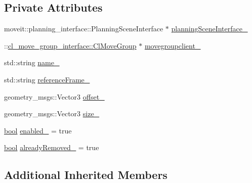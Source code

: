 \subsection*{Private Attributes}
\begin{DoxyCompactItemize}
\item 
moveit\+::planning\+\_\+interface\+::\+Planning\+Scene\+Interface $\ast$ \hyperlink{classsm__fetch__two__table__whiskey__pour_1_1cl__move__group__interface_1_1CpConstraintVirtualSideWall_abc3ab168e5ab2388bf9e0107cc791387}{planning\+Scene\+Interface\+\_\+}
\item 
\+::\hyperlink{classcl__move__group__interface_1_1ClMoveGroup}{cl\+\_\+move\+\_\+group\+\_\+interface\+::\+Cl\+Move\+Group} $\ast$ \hyperlink{classsm__fetch__two__table__whiskey__pour_1_1cl__move__group__interface_1_1CpConstraintVirtualSideWall_a3c89329c38352fd0fa6a75c3c0a69673}{movegroupclient\+\_\+}
\item 
std\+::string \hyperlink{classsm__fetch__two__table__whiskey__pour_1_1cl__move__group__interface_1_1CpConstraintVirtualSideWall_ae90ce7726ac0391281f3f256f855be68}{name\+\_\+}
\item 
std\+::string \hyperlink{classsm__fetch__two__table__whiskey__pour_1_1cl__move__group__interface_1_1CpConstraintVirtualSideWall_a6585ab4c5d9c3dd91be0d2d8b87804bb}{reference\+Frame\+\_\+}
\item 
geometry\+\_\+msgs\+::\+Vector3 \hyperlink{classsm__fetch__two__table__whiskey__pour_1_1cl__move__group__interface_1_1CpConstraintVirtualSideWall_a669238102dc5ac73255f10bc80c1ce69}{offset\+\_\+}
\item 
geometry\+\_\+msgs\+::\+Vector3 \hyperlink{classsm__fetch__two__table__whiskey__pour_1_1cl__move__group__interface_1_1CpConstraintVirtualSideWall_a0e9605699e39ffcda32a22a07fffd544}{size\+\_\+}
\item 
\hyperlink{classbool}{bool} \hyperlink{classsm__fetch__two__table__whiskey__pour_1_1cl__move__group__interface_1_1CpConstraintVirtualSideWall_afdb21410cf37966fbdf12366ebc6dd02}{enabled\+\_\+} = true
\item 
\hyperlink{classbool}{bool} \hyperlink{classsm__fetch__two__table__whiskey__pour_1_1cl__move__group__interface_1_1CpConstraintVirtualSideWall_a9aa0925adf4664e66f5cb5235ca4eeba}{already\+Removed\+\_\+} = true
\end{DoxyCompactItemize}
\subsection*{Additional Inherited Members}


